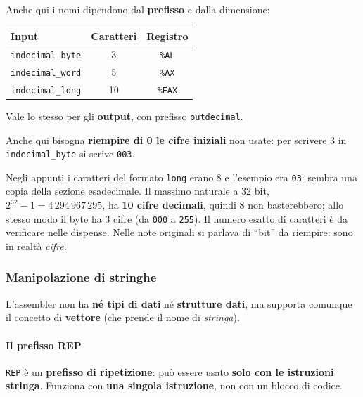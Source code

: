 \documentclass[11pt,a4paper]{article}
\newcommand{\reg}[1]{\texttt{\%#1}}
\begin{document}
Anche qui i nomi dipendono dal \textbf{prefisso} e dalla dimensione:

\begin{center}
\begin{tabular}{l c c}
\textbf{Input} & \textbf{Caratteri} & \textbf{Registro} \\ \hline
\texttt{indecimal\_byte} & 3 & \reg{AL} \\
\texttt{indecimal\_word} & 5 & \reg{AX} \\
\texttt{indecimal\_long} & 10 & \reg{EAX} \\
\end{tabular}
\end{center}

Vale lo stesso per gli \textbf{output}, con prefisso \texttt{outdecimal}.

\begin{nota}[Attenzione]
Anche qui bisogna \textbf{riempire di 0 le cifre iniziali} non usate: per scrivere 3 in \texttt{indecimal\_byte} si scrive \texttt{003}.
\end{nota}

\begin{integrazione}
Negli appunti i caratteri del formato \texttt{long} erano 8 e l'esempio era \texttt{03}: sembra una copia della sezione esadecimale. Il massimo naturale a 32 bit, $2^{32}-1 = 4\,294\,967\,295$, ha \textbf{10 cifre decimali}, quindi 8 non basterebbero; allo stesso modo il byte ha 3 cifre (da \texttt{000} a \texttt{255}). Il numero esatto di caratteri è da verificare nelle dispense. Nelle note originali si parlava di ``bit'' da riempire: sono in realtà \emph{cifre}.
\end{integrazione}

\subsubsection*{Manipolazione di stringhe}

\begin{nota}
L'assembler non ha \textbf{né tipi di dati} né \textbf{strutture dati}, ma supporta comunque il concetto di \textbf{vettore} (che prende il nome di \emph{stringa}).
\end{nota}

\paragraph*{Il prefisso REP}

\texttt{REP} è un \textbf{prefisso di ripetizione}: può essere usato \textbf{solo con le istruzioni stringa}. Funziona con \textbf{una singola istruzione}, non con un blocco di codice.
\end{document}
